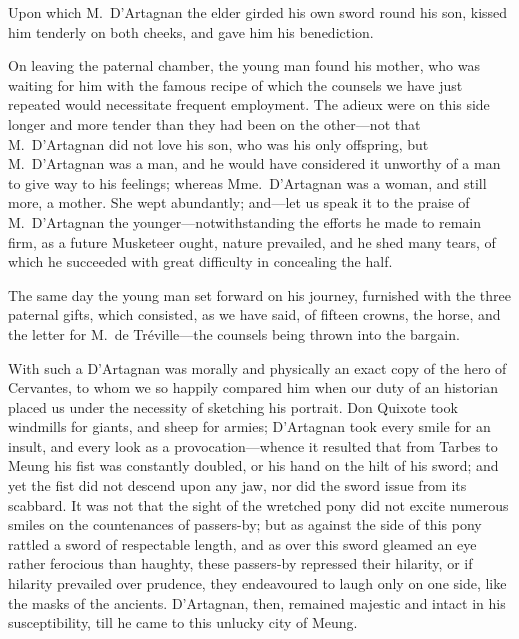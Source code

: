 Upon which M.~D'Artagnan the elder girded his own sword round his son, kissed him tenderly on both cheeks, and gave him his benediction. 

On leaving the paternal chamber, the young man found his mother, who was waiting for him with the famous recipe of which the counsels we have just repeated would necessitate frequent employment. The adieux were on this side longer and more tender than they had been on the other—not that M.~D'Artagnan did not love his son, who was his only offspring, but M.~D'Artagnan was a man, and he would have considered it unworthy of a man to give way to his feelings; whereas Mme.~D'Artagnan was a woman, and still more, a mother. She wept abundantly; and—let us speak it to the praise of M.~D'Artagnan the younger—notwithstanding the efforts he made to remain firm, as a future Musketeer ought, nature prevailed, and he shed many tears, of which he succeeded with great difficulty in concealing the half. 

The same day the young man set forward on his journey, furnished with the three paternal gifts, which consisted, as we have said, of fifteen crowns, the horse, and the letter for M.~de Tréville—the counsels being thrown into the bargain. 

With such a  D'Artagnan was morally and physically an exact copy of the hero of Cervantes, to whom we so happily compared him when our duty of an historian placed us under the necessity of sketching his portrait. Don Quixote took windmills for giants, and sheep for armies; D'Artagnan took every smile for an insult, and every look as a provocation—whence it resulted that from Tarbes to Meung his fist was constantly doubled, or his hand on the hilt of his sword; and yet the fist did not descend upon any jaw, nor did the sword issue from its scabbard. It was not that the sight of the wretched pony did not excite numerous smiles on the countenances of passers-by; but as against the side of this pony rattled a sword of respectable length, and as over this sword gleamed an eye rather ferocious than haughty, these passers-by repressed their hilarity, or if hilarity prevailed over prudence, they endeavoured to laugh only on one side, like the masks of the ancients. D'Artagnan, then, remained majestic and intact in his susceptibility, till he came to this unlucky city of Meung. 

